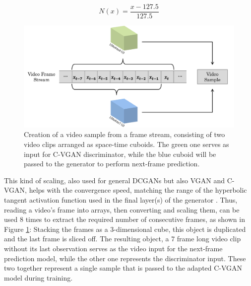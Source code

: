 \begin{equation} \label{eq:norm}
N(x) = \frac{x - 127.5}{127.5}
\end{equation}

\begin{figure}
  \centering
	\includegraphics[width=1\textwidth]{graphics/anomalyDetection/ads/sampleGeneration/sampleGeneration.pdf}
  \caption[Creation of a video sample from a frame stream.]{Creation of a video sample from a frame stream, consisting of two video clips arranged as space-time cuboids. The green one serves as input for C-VGAN discriminator, while the blue cuboid will be passed to the generator to perform next-frame prediction.}
  \label{fig:sample_generator}
\end{figure}

This kind of scaling, also used for general DCGANs but also VGAN and C-VGAN, helps with the convergence speed, matching the range of the hyperbolic tangent activation function used in the final layer(s) of the generator \cite{radford2015unsupervised}. Thus, reading a video's frame into arrays, then converting and scaling them, can be used $8$ times to extract the required number of consecutive frames, as shown in Figure \ref{fig:sample_generator}: Stacking the frames as a 3-dimensional cube, this object is duplicated and the last frame is sliced off. The resulting object, a $7$ frame long video clip without its last observation serves as the video input for the next-frame prediction model, while the other one represents the discriminator input. These two together represent a single sample that is passed to the adapted C-VGAN model during training.

